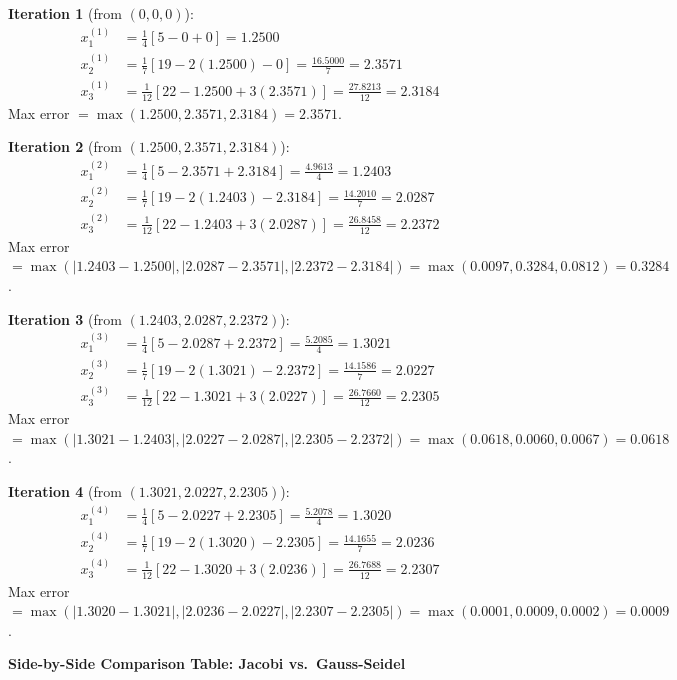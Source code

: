 \documentclass[12pt,a4paper]{article}
\begin{document}
\textbf{Iteration 1} (from \((0,0,0)\)):
\begin{align*}
x_1^{(1)} &= \tfrac{1}{4}[5 - 0 + 0] = 1.2500 \\
x_2^{(1)} &= \tfrac{1}{7}[19 - 2(1.2500) - 0] = \tfrac{16.5000}{7} = 2.3571 \\
x_3^{(1)} &= \tfrac{1}{12}[22 - 1.2500 + 3(2.3571)] = \tfrac{27.8213}{12} = 2.3184
\end{align*}
Max error \(= \max(1.2500, 2.3571, 2.3184) = 2.3571\).

\textbf{Iteration 2} (from \((1.2500, 2.3571, 2.3184)\)):
\begin{align*}
x_1^{(2)} &= \tfrac{1}{4}[5 - 2.3571 + 2.3184] = \tfrac{4.9613}{4} = 1.2403 \\
x_2^{(2)} &= \tfrac{1}{7}[19 - 2(1.2403) - 2.3184] = \tfrac{14.2010}{7} = 2.0287 \\
x_3^{(2)} &= \tfrac{1}{12}[22 - 1.2403 + 3(2.0287)] = \tfrac{26.8458}{12} = 2.2372
\end{align*}
Max error \(= \max(|1.2403-1.2500|,|2.0287-2.3571|,|2.2372-2.3184|)
= \max(0.0097, 0.3284, 0.0812) = 0.3284\).

\textbf{Iteration 3} (from \((1.2403, 2.0287, 2.2372)\)):
\begin{align*}
x_1^{(3)} &= \tfrac{1}{4}[5 - 2.0287 + 2.2372] = \tfrac{5.2085}{4} = 1.3021 \\
x_2^{(3)} &= \tfrac{1}{7}[19 - 2(1.3021) - 2.2372] = \tfrac{14.1586}{7} = 2.0227 \\
x_3^{(3)} &= \tfrac{1}{12}[22 - 1.3021 + 3(2.0227)] = \tfrac{26.7660}{12} = 2.2305
\end{align*}
Max error \(= \max(|1.3021-1.2403|,|2.0227-2.0287|,|2.2305-2.2372|)
= \max(0.0618, 0.0060, 0.0067) = 0.0618\).

\textbf{Iteration 4} (from \((1.3021, 2.0227, 2.2305)\)):
\begin{align*}
x_1^{(4)} &= \tfrac{1}{4}[5 - 2.0227 + 2.2305] = \tfrac{5.2078}{4} = 1.3020 \\
x_2^{(4)} &= \tfrac{1}{7}[19 - 2(1.3020) - 2.2305] = \tfrac{14.1655}{7} = 2.0236 \\
x_3^{(4)} &= \tfrac{1}{12}[22 - 1.3020 + 3(2.0236)] = \tfrac{26.7688}{12} = 2.2307
\end{align*}
Max error \(= \max(|1.3020-1.3021|,|2.0236-2.0227|,|2.2307-2.2305|)
= \max(0.0001, 0.0009, 0.0002) = 0.0009\).

\textbf{Side-by-Side Comparison Table: Jacobi vs.\ Gauss-Seidel}
\end{document}
